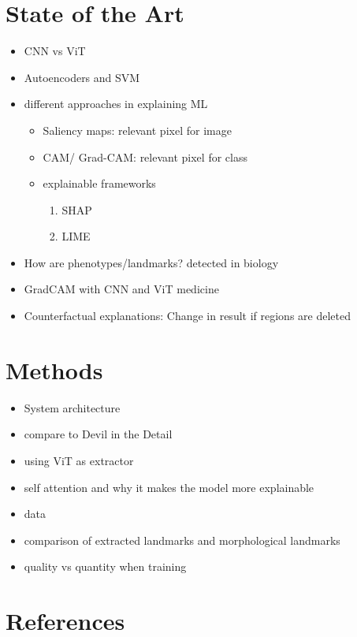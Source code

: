 \documentclass[conference]{IEEEtran}
\begin{document}
\section{State of the Art}
\begin{itemize}
    \item CNN vs ViT \cite{ViTvsCNN}
    \item Autoencoders \cite{autoencoders} and SVM \cite{mandibleShape}
    \item different approaches in explaining ML
    \begin{itemize}
        \item Saliency maps: relevant pixel for image
        \item CAM/ Grad-CAM: relevant pixel for class
        \item explainable frameworks
        \begin{enumerate}
            \item SHAP \cite{SAHP}
            \item LIME \cite{LIME}
        \end{enumerate}
    \end{itemize}
\end{itemize}
\begin{itemize}
    \item How are phenotypes/landmarks? detected in biology
    \item GradCAM with CNN and ViT medicine \cite{neurology}
    \item Counterfactual explanations: Change in result if regions are deleted \cite{counterfactual}

\end{itemize}
\section{Methods}
\begin{itemize}
    \item System architecture \cite{DinoV2} \cite{ViTneedTransformer}
    \item compare to Devil in the Detail \cite{DevilInDetail}
    \item using ViT as extractor  \cite{AttentionIsAll}
    \item self attention and why it makes the model more explainable \cite{ImageIsWorth}
    \item data
    \item comparison of extracted landmarks and morphological landmarks
    \item quality vs quantity when training \cite{OpportunitiesAndChallenges}
\end{itemize}

\section*{References}

\end{document}
